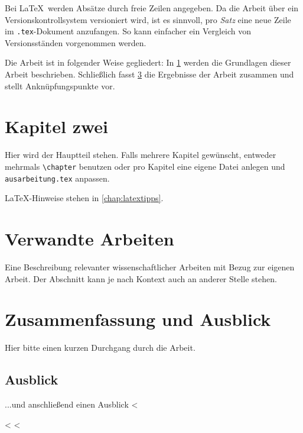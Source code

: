 \documentclass[runningheads,a4paper,ngerman]{llncs}[2022/01/12]
\begin{document}
Bei \LaTeX\ werden Absätze durch freie Zeilen angegeben.
Da die Arbeit über ein Versionskontrollsystem versioniert wird, ist es sinnvoll, pro \emph{Satz} eine neue Zeile im \texttt{.tex}-Dokument anzufangen.
So kann einfacher ein Vergleich von Versionsständen vorgenommen werden.

Die Arbeit ist in folgender Weise gegliedert:
In \cref{chap:k2} werden die Grundlagen dieser Arbeit beschrieben.
Schließlich fasst \cref{chap:zusfas} die Ergebnisse der Arbeit zusammen und stellt Anknüpfungspunkte vor.


\chapter{Kapitel zwei}
\label{chap:k2}

Hier wird der Hauptteil stehen.
Falls mehrere Kapitel gewünscht, entweder mehrmals \texttt{\textbackslash{}chapter} benutzen oder pro Kapitel eine eigene Datei anlegen und \texttt{ausarbeitung.tex} anpassen.

LaTeX-Hinweise stehen in \cref{chap:latextipps}.

\blinddocument

\chapter{Verwandte Arbeiten}
Eine Beschreibung relevanter wissenschaftlicher Arbeiten mit Bezug zur eigenen Arbeit. Der Abschnitt kann je nach Kontext auch an anderer Stelle stehen.

\chapter{Zusammenfassung und Ausblick}\label{chap:zusfas}
Hier bitte einen kurzen Durchgang durch die Arbeit.

\section*{Ausblick}
...und anschließend einen Ausblick
<%

<%
<%
\label{chap:latexhints}
\end{document}

